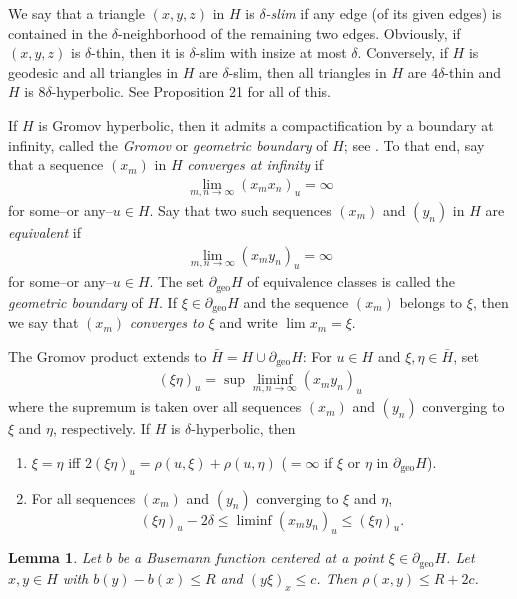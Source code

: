 \documentclass[12pt,a4paper]{amsart}
\numberwithin{equation}{section}
\newtheorem{lem}[equation]{Lemma}
\theoremstyle{definition}
\DeclareMathOperator{\geo}{geo}
\begin{document}
We say that a triangle $(x,y,z)$ in $H$ is \emph{$\delta$-slim} if any edge (of its given edges) is contained in the $\delta$-neighborhood of the remaining two edges.
Obviously, if $(x,y,z)$ is $\delta$-thin, then it is $\delta$-slim with insize at most $\delta$.
Conversely, if $H$ is geodesic and all triangles in $H$ are $\delta$-slim, then all triangles in $H$ are $4\delta$-thin and $H$ is $8\delta$-hyperbolic.
See Proposition 21 \cite[Chapter 2]{GH} for all of this.

If $H$ is Gromov hyperbolic, then it admits a compactification by a boundary at infinity, called the \emph{Gromov} or \emph{geometric boundary} of $H$; see \cite[Chapter 7]{GH}.
To that end, say that a sequence $(x_m)$ in $H$ \emph{converges at infinity} if 
\begin{align*}
	\lim_{m,n\to\infty}(x_mx_n)_u=\infty
\end{align*}
for some--or any--$u\in H$.
Say that two such sequences $(x_m)$ and $(y_n)$ in $H$ are \emph{equivalent} if
\begin{align*}
	\lim_{m,n\to\infty}(x_my_n)_u=\infty
\end{align*}
for some--or any--$u\in H$.
The set $\partial_{\geo}H$ of equivalence classes is called the \emph{geometric boundary} of $H$.
If $\xi\in\partial_{\geo}H$ and the sequence $(x_m)$ belongs to $\xi$, then we say that $(x_m)$ \emph{converges to} $\xi$ and write $\lim x_m=\xi$.

The Gromov product extends to $\bar H=H\cup\partial_{\geo}H$:
For $u\in H$ and $\xi,\eta\in\bar H$, set
\begin{align*}
	(\xi\eta)_u = \sup\liminf_{m,n\to\infty}(x_my_n)_u
\end{align*}
where the supremum is taken over all sequences $(x_m)$ and $(y_n)$ converging to $\xi$ and $\eta$, respectively.
If $H$ is $\delta$-hyperbolic, then
\begin{enumerate}[label=(P\arabic*)]
\item\label{grpri} $\xi=\eta$ iff $2(\xi\eta)_{u}=\rho(u,\xi)+\rho(u,\eta)$ ($=\infty$ if $\xi$ or $\eta$ in $\partial_{\geo}H$).
\item\label{grpre} For all sequences $(x_m)$ and $(y_n)$ converging to $\xi$ and $\eta$,
\[(\xi\eta)_{u}-2\delta\le\liminf(x_my_n)_{u}\le(\xi\eta)_{u}.\]
\end{enumerate}

\begin{lem}\label{R2c}
Let $b$ be a Busemann function centered at a point $\xi\in\partial_{\geo}H$.
Let $x,y\in H$ with $b(y)-b(x)\le R$ and $(y\xi)_x\le c$.
Then $\rho(x,y)\le R+2c$.
\end{lem}
\end{document}
